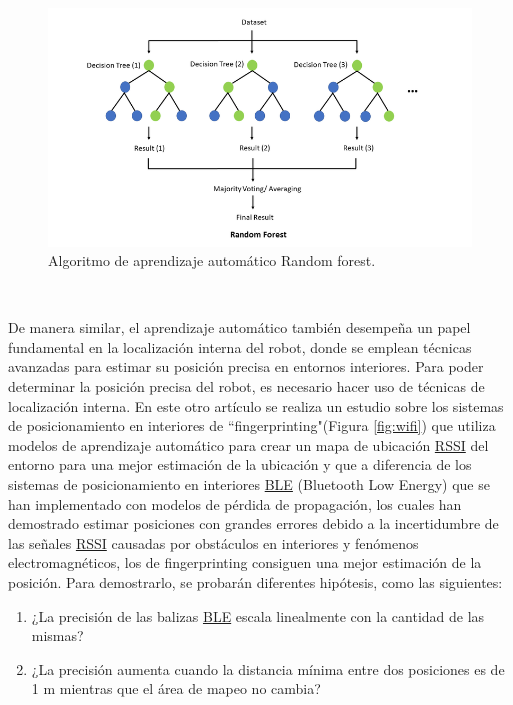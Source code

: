 \begin{figure} [H]
  \begin{center}
    \includegraphics[scale=0.8]{figs/random_forest}
  \end{center}
  \caption{Algoritmo de aprendizaje automático Random forest.}
  \label{fig:random_forest}
\end{figure}\

De manera similar, el aprendizaje automático también desempeña un papel fundamental en la localización interna del robot, donde se emplean técnicas avanzadas para estimar su posición precisa en entornos interiores. Para poder determinar la posición precisa del robot, es necesario hacer uso de técnicas de localización interna. En este otro artículo \cite{unknown} se realiza un estudio sobre los sistemas de posicionamiento en interiores de ``fingerprinting"(Figura \ref{fig:wifi}) que utiliza modelos de aprendizaje automático para crear un mapa de ubicación \hyperlink{RSSI}{RSSI} del entorno para una mejor estimación de la ubicación y que a diferencia de los sistemas de posicionamiento en interiores \hyperlink{BLE}{BLE} (Bluetooth Low Energy) que se han implementado con modelos de pérdida de propagación, los cuales han demostrado estimar posiciones con grandes errores debido a la incertidumbre de las señales \hyperlink{RSSI}{RSSI} causadas por obstáculos en interiores y fenómenos electromagnéticos, los de fingerprinting consiguen una mejor estimación de la posición. Para demostrarlo, se probarán diferentes hipótesis, como las siguientes:

\begin{enumerate}
 \item ¿La precisión de las balizas \hyperlink{BLE}{BLE} escala linealmente con la cantidad de las mismas?
 \item ¿La precisión aumenta
cuando la distancia mínima entre dos posiciones es de 1 m mientras que el área de mapeo no cambia?
\end{enumerate}\ 

